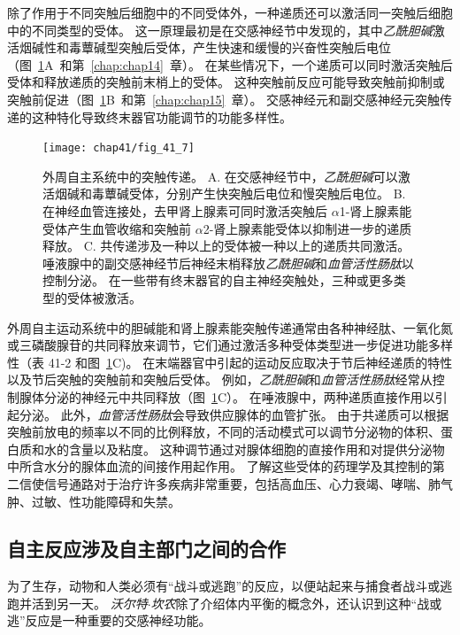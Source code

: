 除了作用于不同突触后细胞中的不同受体外，一种递质还可以激活同一突触后细胞中的不同类型的受体。
这一原理最初是在交感神经节中发现的，其中\textit{乙酰胆碱}激活烟碱性和毒蕈碱型突触后受体，产生快速和缓慢的兴奋性突触后电位（图~\ref{fig:41_7}A~和第~\ref{chap:chap14}~章）。
在某些情况下，一个递质可以同时激活突触后受体和释放递质的突触前末梢上的受体。
这种突触前反应可能导致突触前抑制或突触前促进（图~\ref{fig:41_7}B~和第~\ref{chap:chap15}~章）。
交感神经元和副交感神经元突触传递的这种特化导致终末器官功能调节的功能多样性。


\begin{figure}[htbp]
	\centering
	\texttt{[image: chap41/fig\_41\_7]}
	\caption{外周自主系统中的突触传递。
		A. 在交感神经节中，\textit{乙酰胆碱}可以激活烟碱和毒蕈碱受体，分别产生快突触后电位和慢突触后电位。
		B. 在神经血管连接处，去甲肾上腺素可同时激活突触后 $\alpha$1-肾上腺素能受体产生血管收缩和突触前 $\alpha$2-肾上腺素能受体以抑制进一步的递质释放。
		C. 共传递涉及一种以上的受体被一种以上的递质共同激活。
		唾液腺中的副交感神经节后神经末梢释放\textit{乙酰胆碱}和\textit{血管活性肠肽}以控制分泌。
		在一些带有终末器官的自主神经突触处，三种或更多类型的受体被激活。}
	\label{fig:41_7}
\end{figure}


外周自主运动系统中的胆碱能和肾上腺素能突触传递通常由各种神经肽、一氧化氮或三磷酸腺苷的共同释放来调节，它们通过激活多种受体类型进一步促进功能多样性（表 41-2 和图~\ref{fig:41_7}C)。
在末端器官中引起的运动反应取决于节后神经递质的特性以及节后突触的突触前和突触后受体。
例如，\textit{乙酰胆碱}和\textit{血管活性肠肽}经常从控制腺体分泌的神经元中共同释放（图~\ref{fig:41_7}C）。
在唾液腺中，两种递质直接作用以引起分泌。
此外，\textit{血管活性肠肽}会导致供应腺体的血管扩张。
由于共递质可以根据突触前放电的频率以不同的比例释放，不同的活动模式可以调节分泌物的体积、蛋白质和水的含量以及粘度。
这种调节通过对腺体细胞的直接作用和对提供分泌物中所含水分的腺体血流的间接作用起作用。
了解这些受体的药理学及其控制的第二信使信号通路对于治疗许多疾病非常重要，包括高血压、心力衰竭、哮喘、肺气肿、过敏、性功能障碍和失禁。



\subsection{自主反应涉及自主部门之间的合作}

为了生存，动物和人类必须有“战斗或逃跑”的反应，以便站起来与捕食者战斗或逃跑并活到另一天。
\textit{沃尔特$\cdot$坎农}除了介绍体内平衡的概念外，还认识到这种“战或逃”反应是一种重要的交感神经功能。


